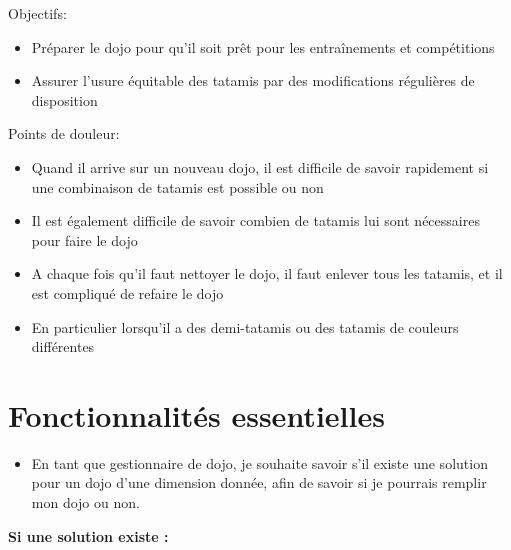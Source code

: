 Objectifs:
\begin{itemize}
    \item Préparer le dojo pour qu’il soit prêt pour les entraînements et compétitions
    \item Assurer l’usure équitable des tatamis par des modifications régulières de disposition
\end{itemize}

Points de douleur:
\begin{itemize}
    \item Quand il arrive sur un nouveau dojo, il est difficile de savoir rapidement si une 
    combinaison de tatamis est possible ou non
    \item Il est également difficile de savoir combien de tatamis lui sont nécessaires pour 
    faire le dojo
    \item A chaque fois qu’il faut nettoyer le dojo, il faut enlever tous les tatamis, et 
    il est compliqué de refaire le dojo
    \item En particulier lorsqu’il a des demi-tatamis ou des tatamis de couleurs différentes

\end{itemize}



\section{Fonctionnalités essentielles}


\begin{itemize}
    \item En tant que gestionnaire de dojo, je souhaite savoir s’il existe une solution pour
     un dojo d'une dimension donnée, afin de savoir si je pourrais remplir mon dojo ou non.
\end{itemize}


\textbf{ Si une solution existe :}

